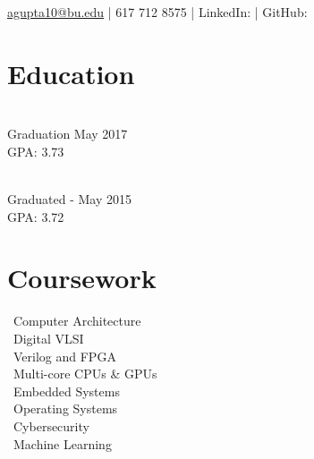 \documentclass[]{deedy_format_Anmol}
\begin{document}
%
%
\lastupdated

%
%


{\href{mailto:agupta10@bu.edu}{agupta10@bu.edu} | 617 712 8575 | 
LinkedIn:  \href{https://www.linkedin.com/in/anmol-gupta-90b67a108}{} |
GitHub:   \href{https://github.com/anmolgupta1005/}{}
}

%
%

\begin{minipage}[t]{0.325\textwidth} 


\section{Education} 
\vspace{0.5mm} %
\\
Graduation May 2017 \\ GPA: 3.73
\sectionsep

\\		
Graduated - May 2015 \\ GPA: 3.72
\sectionsep

\sectionsep

\section{Coursework}
\vspace{0.5mm} %
\flushleft
\textbullet \, Computer Architecture\\
\textbullet \, Digital VLSI \\
\textbullet \, Verilog and FPGA\\
\textbullet \, Multi-core CPUs \& GPUs\\
\textbullet \, Embedded Systems\\
\textbullet \, Operating Systems\\
\textbullet \, Cybersecurity\\
\textbullet \, Machine Learning
\sectionsep



\end{minipage}
\end{document}
